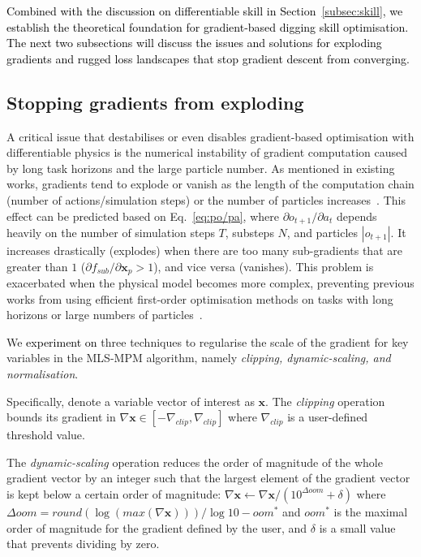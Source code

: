 \documentclass[letterpaper, 10 pt, journal, twoside]{ieeetran}
\newcommand{\rp}[1]{\textcolor{black}{#1}}
\begin{document}
\rp{Combined with the discussion on differentiable skill in Section~\ref{subsec:skill}, we establish the theoretical foundation for gradient-based digging skill optimisation. The next two subsections will discuss the issues and solutions for exploding gradients and rugged loss landscapes that stop gradient descent from converging.}

\subsection{Stopping gradients from exploding}\label{subsec:grad-explode}
A critical issue that destabilises or even disables gradient-based optimisation with differentiable physics is the numerical instability of gradient computation caused by long task horizons and the large particle number. As mentioned in existing works, gradients tend to explode or vanish as the length of the computation chain (number of actions/simulation steps) or the number of particles increases~\cite{xu2021accelerated,lin2022diffskill}. This effect can be predicted based on Eq.~\ref{eq:po/pa}, where $\partial o_{t+1}/\partial a_t$ depends heavily on the number of simulation steps $T$, substeps $N$, and particles $|o_{t+1}|$. It increases drastically (explodes) when there are too many sub-gradients that are greater than $1$ ($\partial f_{sub}/\partial \pmb{x}_p>1$), and vice versa (vanishes). This problem is exacerbated when the physical model becomes more complex, preventing previous works from using efficient first-order optimisation methods on tasks with long horizons or large numbers of particles~\cite{xu2021accelerated,chen2022diffsrl,lin2022diffskill,xian2023fluidlab}. 

We \rp{experiment on} three techniques to regularise the scale of the gradient for key variables in the MLS-MPM algorithm, namely \textit{clipping, dynamic-scaling, and normalisation}. 

Specifically, denote a variable vector of interest as $\pmb{x}$. The \textit{clipping} operation bounds its gradient in $\nabla \pmb{x}\in[-\nabla_{clip}, \nabla_{clip}]$ where $\nabla_{clip}$ is a user-defined threshold value. 

The \textit{dynamic-scaling} operation reduces the order of magnitude of the whole gradient vector by an integer such that the largest element of the gradient vector is kept below a certain order of magnitude: 
$\nabla \pmb{x} \leftarrow \nabla \pmb{x} / (10^{\Delta oom}+\delta)$
where $\Delta oom=round(\log(max(\nabla \pmb{x})))/\log 10 - oom^*$ and $oom^*$ is the maximal order of magnitude for the gradient defined by the user, and $\delta$ is a small value that prevents dividing by zero. 
\end{document}
